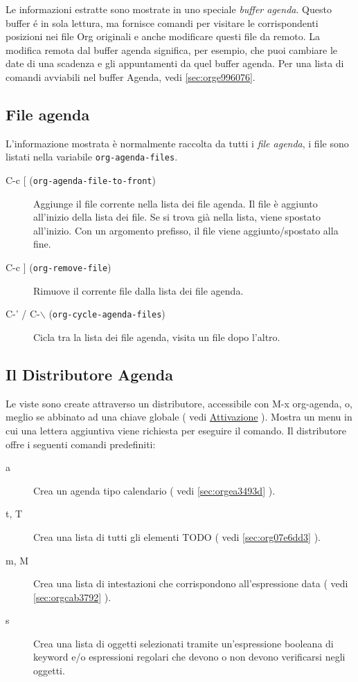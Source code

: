 \documentclass[11pt]{article}
\begin{document}
Le informazioni estratte sono mostrate in uno speciale \emph{buffer
agenda}. Questo buffer é in sola lettura, ma fornisce comandi per
visitare le corrispondenti posizioni nei file Org originali e anche
modificare questi file da remoto. La modifica remota dal buffer agenda
significa, per esempio, che puoi cambiare le date di una scadenza e
gli appuntamenti da quel buffer agenda. Per una lista di comandi
avviabili nel buffer Agenda, vedi \ref{sec:orge996076}.

\subsection{File agenda}
\label{sec:orgaaa999e}
L'informazione mostrata è normalmente raccolta da tutti i \emph{file
agenda}, i file sono listati nella variabile \texttt{org-agenda-files}.

\begin{description}
\item[{C-c [ (\texttt{org-agenda-file-to-front})}] Aggiunge il file corrente nella lista dei file agenda. Il file è
aggiunto all'inizio della lista dei file. Se si trova già nella
lista, viene spostato all'inizio. Con un argomento prefisso, il file
viene aggiunto/spostato alla fine.

\item[{C-c ] (\texttt{org-remove-file})}] Rimuove il corrente file dalla lista dei file agenda.

\item[{C-' / C-$\backslash$ (\texttt{org-cycle-agenda-files})}] Cicla tra la lista dei file agenda, visita un file dopo l'altro.
\end{description}

\subsection[Agenda Dispatcher]{Il Distributore Agenda}
\label{sec:orgef705e3}
Le viste sono create attraverso un distributore, accessibile con
M-x org-agenda, o, meglio se abbinato ad una chiave globale (
vedi \hyperref[sec:orgb24a1ce]{Attivazione} ). Mostra un menu in cui una lettera aggiuntiva
viene richiesta per eseguire il comando. Il distributore offre i
seguenti comandi predefiniti:

\begin{description}
\item[{a}] Crea un agenda tipo calendario ( vedi \ref{sec:orgea3493d} ).

\item[{t, T}] Crea una lista di tutti gli elementi TODO ( vedi \ref{sec:org07e6dd3}
).

\item[{m, M}] Crea una lista di intestazioni che corrispondono all'espressione data ( vedi
\ref{sec:orgcab3792} ).

\item[{s}] Crea una lista di oggetti selezionati tramite un'espressione
booleana di keyword e/o espressioni regolari che devono o non devono
verificarsi negli oggetti.
\end{description}
\end{document}
